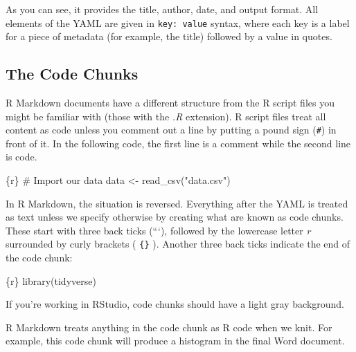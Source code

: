 \documentclass[
]{book}
\newenvironment{Shaded}{\begin{snugshade}}{\end{snugshade}}
\newcommand{\NormalTok}[1]{#1}
\begin{document}
As you can see, it provides the title, author, date, and output format. All elements of the YAML are given in \texttt{key:\ value} syntax, where each key is a label for a piece of metadata (for example, the title) followed by a value in quotes.

\hypertarget{the-code-chunks}{%
\subsection*{The Code Chunks}\label{the-code-chunks}}

R Markdown documents have a different structure from the R script files you might be familiar with (those with the \emph{.R} extension). R script files treat all content as code unless you comment out a line by putting a pound sign (\texttt{\#}) in front of it. In the following code, the first line is a comment while the second line is code.

\begin{Shaded}
\begin{Highlighting}[]
\NormalTok{\textasciigrave{}\textasciigrave{}\textasciigrave{}\{r\}}
\NormalTok{\# Import our data}
\NormalTok{data \textless{}{-} read\_csv("data.csv")}
\NormalTok{\textasciigrave{}\textasciigrave{}\textasciigrave{}}
\end{Highlighting}
\end{Shaded}

In R Markdown, the situation is reversed. Everything after the YAML is treated as text unless we specify otherwise by creating what are known as code chunks. These start with three back ticks (```), followed by the lowercase letter \emph{r} surrounded by curly brackets ( \texttt{\{\}} ). Another three back ticks indicate the end of the code chunk:

\begin{Shaded}
\begin{Highlighting}[]
\NormalTok{\textasciigrave{}\textasciigrave{}\textasciigrave{}\{r\}}
\NormalTok{library(tidyverse)}
\NormalTok{\textasciigrave{}\textasciigrave{}\textasciigrave{}}
\end{Highlighting}
\end{Shaded}

If you're working in RStudio, code chunks should have a light gray background.

R Markdown treats anything in the code chunk as R code when we knit. For example, this code chunk will produce a histogram in the final Word document.
\end{document}

